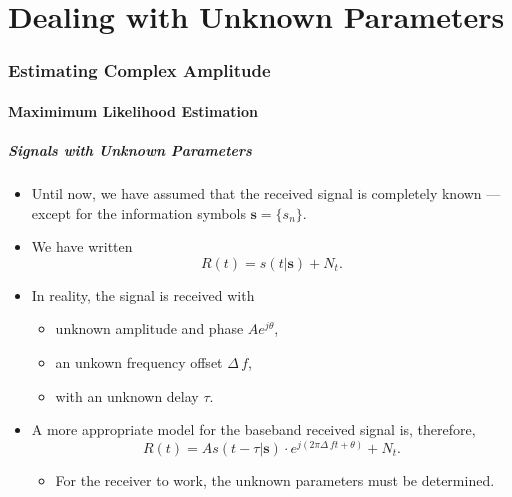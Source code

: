\part{Dealing with Unknown Parameters}

\frame{\partpage}


\section{Estimating Complex Amplitude}

\subsection{Maximimum Likelihood Estimation}

\begin{frame}
  \frametitle{Signals with Unknown Parameters}
  \begin{itemize}
  \item Until now, we have assumed that the received signal is
    completely known --- except for the information symbols
    $\mathbf{s} = \{s_n\}$.
  \item  We have written
    \[
      R(t) = s(t| \mathbf{s}) + N_t.
    \]
  \item In reality, the signal is received with
    \begin{itemize}
    \item unknown amplitude and phase $Ae^{j\theta}$,
    \item an unkown frequency offset $\Delta\,f$,
    \item with an unknown delay $\tau$.
    \end{itemize}
  \item A more appropriate model for the baseband received signal is,
    therefore,
    \[
      R(t) = A s(t-\tau| \mathbf{s}) \cdot e^{j(2\pi \Delta\,ft +
        \theta)} + N_t.
    \]
    \begin{itemize}
    \item For the receiver to work, the unknown parameters must be determined.
    \end{itemize}
  \end{itemize}
\end{frame}

